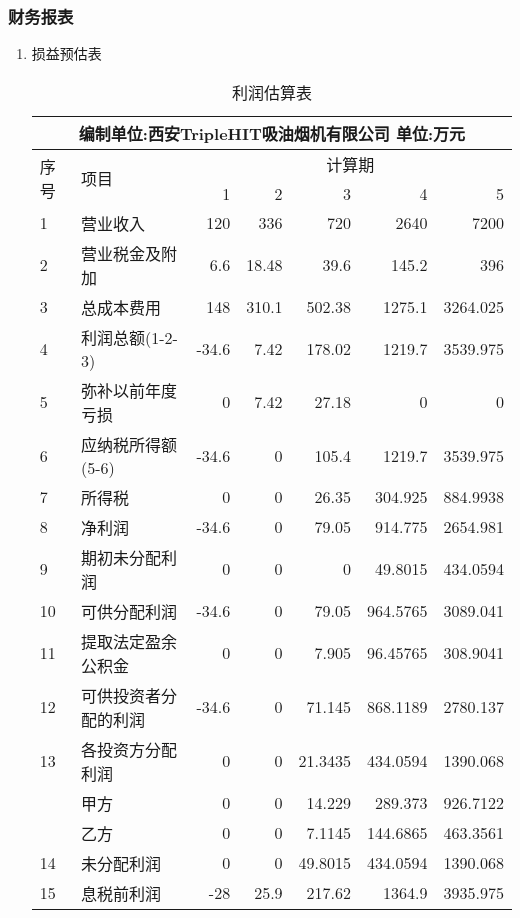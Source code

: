 \newpage
\subsubsection{财务报表}
\begin{enumerate}
\item 损益预估表

      \begin{table}[H]
      \centering
      \caption{利润估算表}
      \begin{tabular}{|llrrrrr|}
      \toprule
      \multicolumn{7}{c}{编制单位:西安TripleHIT吸油烟机有限公司                             单位:万元} \\
      \hline
      \multirow{2}[0]{*}{序号} & \multirow{2}[0]{*}{项目} & \multicolumn{5}{c}{计算期} \\
           &       & 1     & 2     & 3     & 4     & 5 \\
      \hline
      1     & 营业收入  & 120   & 336   & 720   & 2640  & 7200 \\
      2     & 营业税金及附加 & 6.6   & 18.48 & 39.6  & 145.2 & 396 \\
      3     & 总成本费用 & 148   & 310.1 & 502.38 & 1275.1 & 3264.025 \\
      4     & 利润总额(1-2-3) & -34.6 & 7.42  & 178.02 & 1219.7 & 3539.975 \\
      5     & 弥补以前年度亏损 & 0     & 7.42  & 27.18 & 0     & 0 \\
      6     & 应纳税所得额(5-6) & -34.6 & 0     & 105.4 & 1219.7 & 3539.975 \\
      7     & 所得税   & 0     & 0     & 26.35 & 304.925 & 884.9938 \\
      8     & 净利润   & -34.6 & 0     & 79.05 & 914.775 & 2654.981 \\
      9     & 期初未分配利润 & 0     & 0     & 0     & 49.8015 & 434.0594 \\
      10    & 可供分配利润 & -34.6 & 0     & 79.05 & 964.5765 & 3089.041 \\
      11    & 提取法定盈余公积金 & 0     & 0     & 7.905 & 96.45765 & 308.9041 \\
      12    & 可供投资者分配的利润 & -34.6 & 0     & 71.145 & 868.1189 & 2780.137 \\
      13    & 各投资方分配利润 & 0     & 0     & 21.3435 & 434.0594 & 1390.068 \\
            & 甲方    & 0     & 0     & 14.229 & 289.373 & 926.7122 \\
            & 乙方    & 0     & 0     & 7.1145 & 144.6865 & 463.3561 \\
      14    & 未分配利润 & 0     & 0     & 49.8015 & 434.0594 & 1390.068 \\
      15    & 息税前利润 & -28   & 25.9  & 217.62 & 1364.9 & 3935.975 \\
      \bottomrule
      \end{tabular}%
      \label{tab:addlabel}%
      \end{table}


\end{enumerate}
